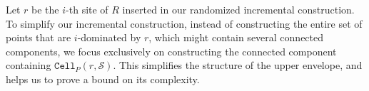 \documentclass[a4paper,UKenglish]{socg-lipics-v2018}
\newcommand{\icell}[1][i]{${#1}$-patch\xspace}
\newcommand{\icells}[1][i]{${#1}$-patches\xspace}
\newcommand{\idom}[1][i]{${#1}$-dominated\xspace}
\newcommand{\s}{\mathcal S}
\newcommand{\dd}[3][P]{\ensuremath{\textsc{d}_{\scriptscriptstyle w}^{\scriptscriptstyle #1}(#2 {\leadsto} #3)}}
\newcommand{\funnel}[2][P]{\ensuremath{\mathtt{Funnel}_{\scriptscriptstyle #1}(#2)}}
\newcommand{\cell}[2][P]{\ensuremath{\mathtt{Cell}_{\scriptscriptstyle #1}(#2)}}
\begin{document}
%
%





Let $r$ be the $i$-th site of $R$ inserted in our randomized incremental construction. 
To simplify our incremental construction, instead of constructing the entire set of points that are \idom by $r$, which might contain several connected components,
we focus exclusively on constructing the connected component containing $\cell{r, \s}$.
This simplifies the structure of the upper envelope, and helps us to prove a bound on its complexity. 
\end{document}
